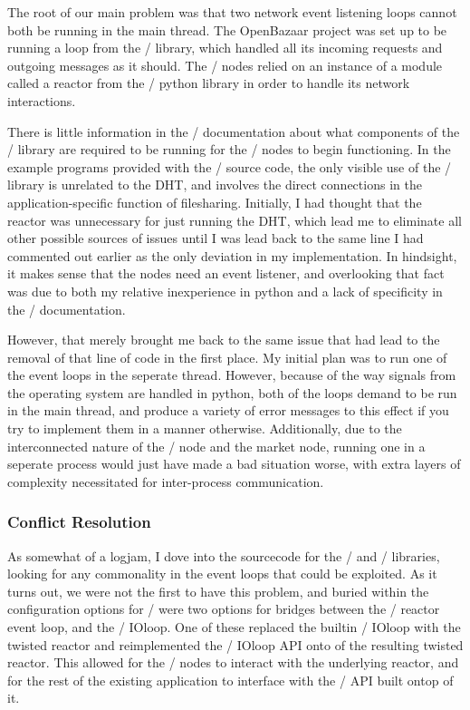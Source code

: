 \documentclass[12pt,twocolumn]{article}
\begin{document}
The root of our main problem was that two network event listening loops cannot both be running in the main thread. The OpenBazaar project was set up to be running a loop from the \Tornado/ library, which handled all its incoming requests and outgoing messages as it should. The \Entangled/ nodes relied on an instance of a module called a {{\sc reactor}} from the \Twisted/ python library in order to handle its network interactions.

There is little information in the \Entangled/ documentation about what components of the \Twisted/ library are required to be running for the \Entangled/ nodes to begin functioning. In the example programs provided with the \Entangled/ source code, the only visible use of the \Twisted/ library is unrelated to the DHT, and involves the direct connections in the application-specific function of filesharing. Initially, I had thought that the reactor was unnecessary for just running the DHT, which lead me to eliminate all other possible sources of issues until I was lead back to the same line I had commented out earlier as the only deviation in my implementation. In hindsight, it makes sense that the nodes need an event listener, and overlooking that fact was due to both my relative inexperience in python and a lack of specificity in the \Entangled/ documentation.

However, that merely brought me back to the same issue that had lead to the removal of that line of code in the first place. My initial plan was to run one of the event loops in the seperate thread. However, because of the way signals from the operating system are handled in python, both of the loops demand to be run in the main thread, and produce a variety of error messages to this effect if you try to implement them in a manner otherwise. Additionally, due to the interconnected nature of the \Entangled/ node and the market node, running one in a seperate process would just have made a bad situation worse, with extra layers of complexity necessitated for inter-process communication.

\subsubsection{Conflict Resolution}
As somewhat of a logjam, I dove into the sourcecode for the \Tornado/ and \Twisted/ libraries, looking for any commonality in the event loops that could be exploited. As it turns out, we were not the first to have this problem, and buried within the configuration options for \Tornado/ were two options for bridges between the \Twisted/ reactor event loop, and the \Tornado/ IOloop. One of these replaced the builtin \Tornado/ IOloop with the twisted reactor and reimplemented the \Tornado/ IOloop API onto of the resulting twisted reactor. This allowed for the \Entangled/ nodes to interact with the underlying reactor, and for the rest of the existing application to interface with the \Tornado/ API built ontop of it.
\end{document}
